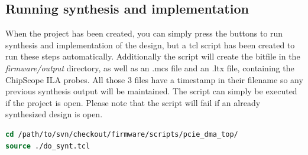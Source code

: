 \subsection{Running synthesis and implementation}
When the project has been created, you can simply press the buttons to run synthesis and implementation of the design, but a tcl script has been created to run these steps automatically. Additionally the script will create the bitfile in the \textit{firmware/output} directory, as well as an .mcs file and an .ltx file, containing the ChipScope ILA probes. All those 3 files have a timestamp in their filename so any previous synthesis output will be maintained.
The script can simply be executed if the project is open. Please note that the script will fail if an already synthesized design is open.
\begin{lstlisting}[frame=single, language=tcl, caption=start synthesis / implementation]
cd /path/to/svn/checkout/firmware/scripts/pcie_dma_top/
source ./do_synt.tcl
\end{lstlisting}
\newpage



